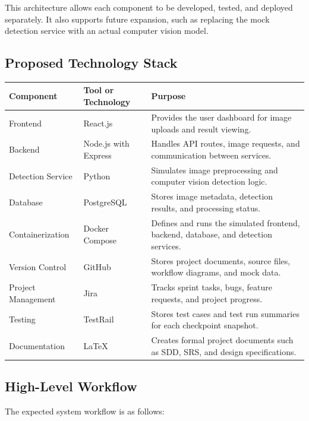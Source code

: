\documentclass[12pt]{article}
\begin{document}
This architecture allows each component to be developed, tested, and deployed separately. It also supports future expansion, such as replacing the mock detection service with an actual computer vision model.

\subsection{Proposed Technology Stack}

\begin{longtable}{|p{1.7in}|p{2in}|p{2.5in}|}
\hline
\textbf{Component} & \textbf{Tool or Technology} & \textbf{Purpose} \\
\hline
Frontend & React.js & Provides the user dashboard for image uploads and result viewing. \\
\hline
Backend & Node.js with Express & Handles API routes, image requests, and communication between services. \\
\hline
Detection Service & Python & Simulates image preprocessing and computer vision detection logic. \\
\hline
Database & PostgreSQL & Stores image metadata, detection results, and processing status. \\
\hline
Containerization & Docker Compose & Defines and runs the simulated frontend, backend, database, and detection services. \\
\hline
Version Control & GitHub & Stores project documents, source files, workflow diagrams, and mock data. \\
\hline
Project Management & Jira & Tracks sprint tasks, bugs, feature requests, and project progress. \\
\hline
Testing & TestRail & Stores test cases and test run summaries for each checkpoint snapshot. \\
\hline
Documentation & LaTeX & Creates formal project documents such as SDD, SRS, and design specifications. \\
\hline
\end{longtable}

\subsection{High-Level Workflow}

The expected system workflow is as follows:
\end{document}

